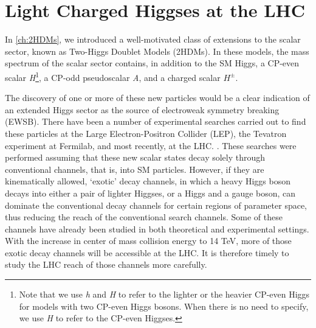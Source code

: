 \chapter{Light Charged Higgses at the LHC}\label{ch:LightChargedHiggs}

\def\h{h}
\def\H{h}
\def\A{A}
\newcommand{\sba}{\ensuremath{\sin(\beta-\alpha)}}
\newcommand{\cba}{\ensuremath{\cos(\beta-\alpha)}}
\newcommand{\met}{\ensuremath{{\not\mathrel{E}}_T}}
\newcommand{\ifb}{\ensuremath{ \text{fb}^{-1} }}
\newcommand{\cmark}{\ding{51}}%
\newcommand{\xmark}{\ding{55}}%

In \autoref{ch:2HDMs}, we introduced a well-motivated class of extensions to the scalar sector, known as Two-Higgs Doublet Models (2HDMs). In these models, the mass spectrum of the scalar sector contains, in addition to the SM Higgs, a CP-even scalar \emph{H}\footnote{Note that we use \emph{h} and \emph{H} to refer to the lighter or the heavier CP-even Higgs for models with two CP-even Higgs bosons. When there is no need to specify, we use \emph{H} to refer to the CP-even Higgses.}, a CP-odd pseudoscalar \emph{A}, and a charged scalar $H^\pm$. 

The discovery of one or more of these new particles would be a clear indication of an extended Higgs sector as the source of electroweak symmetry breaking (EWSB). There have been a number of experimental searches carried out to find these particles at the Large Electron-Positron Collider (LEP), the Tevatron experiment at Fermilab, and most recently, at the LHC. \cite{LEP_Higgs, Aad:2014vgg, Khachatryan:2014wca, TheATLAScollaboration:2013wia, CMS:2014cdp, Aad:2013hla, CMS:2014kga, Khachatryan:2015cwa}. These searches were performed assuming that these new scalar states decay solely through conventional channels, that is, into SM particles. However, if they are kinematically allowed, `exotic' decay channels, in which a heavy Higgs boson decays into either a pair of lighter Higgses, or a Higgs and a gauge boson, can dominate the conventional decay channels for certain regions of parameter space, thus reducing the reach of the conventional search channels. Some of these channels have already been studied in both theoretical \cite{Curtin:2013fra, Brownson:2013lka, Coleppa:2014hxa, Coleppa:2014cca,Li:2015lra,Dorsch:2014qja,Chen:2013emb,Chen:2014dma,Enberg:2014pua} and experimental \cite{Aad:2015wra, CMS:2014yra,CMS:2013eua} settings. With the increase in center of mass collision energy to 14 TeV, more of those exotic decay channels will be accessible at the LHC. It is therefore timely to study the LHC reach of those channels more carefully.

